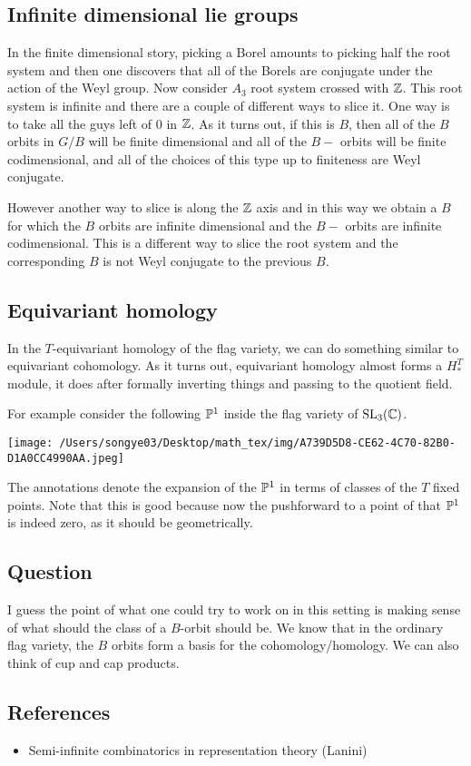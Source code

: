 \documentclass[12pt]{article}
\begin{document}
\subsection{Infinite dimensional lie groups}
In the finite dimensional story, picking a Borel amounts to picking half the root system and then one discovers that all of the Borels are conjugate under the action of the Weyl group. Now consider $A_3$ root system crossed with $\Z$. This root system is infinite and there are a couple of different ways to slice it. One way is to take all the guys left of $0$ in $\Z$. As it turns out, if this is $B$, then all of the $B$ orbits in $G/B$ will be finite dimensional and all of the $B-$ orbits will be finite codimensional, and all of the choices of this type up to finiteness are Weyl conjugate.

\hfill 

However another way to slice is along the $\Z$ axis and in this way we obtain a $B$ for which the $B$ orbits are infinite dimensional and the $B-$ orbits are infinite codimensional. This is a different way to slice the root system and the corresponding $B$ is not Weyl conjugate to the previous $B$.

\subsection{Equivariant homology}
In the $T$-equivariant homology of the flag variety, we can do something similar to equivariant cohomology. As it turns out, equivariant homology almost forms a $H_*^T$ module, it does after formally inverting things and passing to the quotient field. 

\hfill

For example consider the following $\P^1$ inside the flag variety of $\SL_3(\C)$.

\begin{center}
    \texttt{[image: /Users/songye03/Desktop/math\_tex/img/A739D5D8-CE62-4C70-82B0-D1A0CC4990AA.jpeg]}
\end{center}

The annotations denote the expansion of the $\P^1$ in terms of classes of the $T$ fixed points. Note that this is good because now the pushforward to a point of that $\P^1$ is indeed zero, as it should be geometrically.

\subsection{Question}
I guess the point of what one could try to work on in this setting is making sense of what should the class of a $B$-orbit should be. We know that in the ordinary flag variety, the $B$ orbits form a basis for the cohomology/homology. We can also think of cup and cap products. 

\subsection{References}
\begin{itemize}
    \item Semi-infinite combinatorics in representation theory (Lanini)
\end{itemize}
\end{document}
